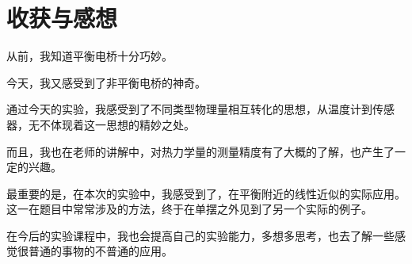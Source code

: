 \documentclass{ctexart}
\begin{document}
\section{收获与感想}
从前，我知道平衡电桥十分巧妙。

今天，我又感受到了非平衡电桥的神奇。

通过今天的实验，我感受到了不同类型物理量相互转化的思想，从温度计到传感器，无不体现着这一思想的精妙之处。

而且，我也在老师的讲解中，对热力学量的测量精度有了大概的了解，也产生了一定的兴趣。

最重要的是，在本次的实验中，我感受到了，在平衡附近的线性近似的实际应用。这一在题目中常常涉及的方法，终于在单摆之外见到了另一个实际的例子。

在今后的实验课程中，我也会提高自己的实验能力，多想多思考，也去了解一些感觉很普通的事物的不普通的应用。
\end{document}
